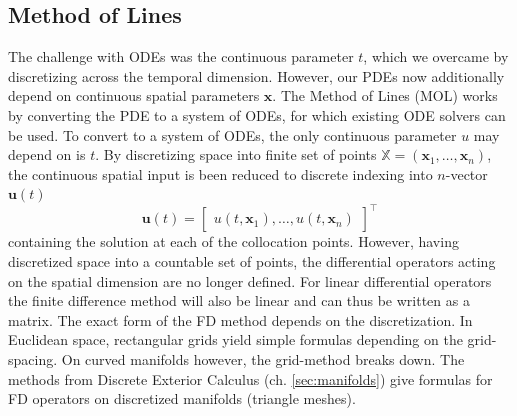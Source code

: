 \subsection*{Method of Lines}
The challenge with ODEs was the continuous parameter $t$, which we overcame by discretizing across the temporal dimension. However, our PDEs now additionally depend on continuous spatial parameters $\mathbf{x}$. The Method of Lines (MOL) \cite{mol} works by converting the PDE to a system of ODEs, for which existing ODE solvers can be used. To convert to a system of ODEs, the only continuous parameter $u$ may depend on is $t$. By discretizing space into finite set of points $\mathbb{X} = (\mathbf{x}_1, \dots, \mathbf{x}_n)$, the continuous spatial input is been reduced to discrete indexing into $n$-vector $\mathbf{u}(t)$
$$\mathbf{u}(t) = \begin{bmatrix}
    u(t, \mathbf{x}_1), \dots, u(t, \mathbf{x}_n)
\end{bmatrix}^\top$$ 
containing the solution at each of the collocation points. However, having discretized space into a countable set of points, the differential operators acting on the spatial dimension are no longer defined. 
For linear differential operators the finite difference method will also be linear and can thus be written as a matrix. The exact form of the FD method depends on the discretization. In Euclidean space, rectangular grids yield simple formulas depending on the grid-spacing. On curved manifolds however, the grid-method breaks down. The methods from Discrete Exterior Calculus (ch. \ref{sec:manifolds}) give formulas for FD operators on discretized manifolds (triangle meshes). 
